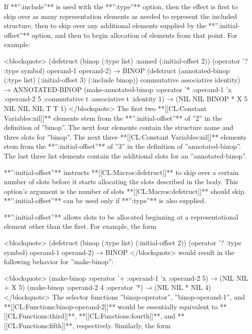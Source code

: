 If **'':include''** is used with the **'':type''** option, then the effect is first to skip over as many representation elements as needed to represent the included structure, then to skip over any additional elements supplied by the **'':initial-offset''** option, and then to begin allocation of elements from that point. For example:

<blockquote> (defstruct (binop (:type list) :named (:initial-offset 2)) (operator '? :type symbol) operand-1 operand-2) → BINOP (defstruct (annotated-binop (:type list) (:initial-offset 3) (:include binop)) commutative associative identity) → ANNOTATED-BINOP (make-annotated-binop :operator '* :operand-1 'x :operand-2 5 :commutative t :associative t :identity 1) → (NIL NIL BINOP * X 5 NIL NIL NIL T T 1) </blockquote> The first two **[[CL:Constant Variables:nil]]** elements stem from the **'':initial-offset''** of ''2'' in the definition of ''binop''. The next four elements contain the structure name and three slots for ''binop''. The next three **[[CL:Constant Variables:nil]]** elements stem from the **'':initial-offset''** of ''3'' in the definition of ''annotated-binop''. The last three list elements contain the additional slots for an ''annotated-binop''.


**'':initial-offset''** instructs **[[CL:Macros:defstruct]]** to skip over a certain number of slots before it starts allocating the slots described in the body. This option's argument is the number of slots **[[CL:Macros:defstruct]]** should skip. **'':initial-offset''** can be used only if **'':type''** is also supplied.


**'':initial-offset''** allows slots to be allocated beginning at a representational element other than the first. For example, the form

<blockquote> (defstruct (binop (:type list) (:initial-offset 2)) (operator '? :type symbol) operand-1 operand-2) → BINOP </blockquote> would result in the following behavior for ''make-binop'':

<blockquote> (make-binop :operator '+ :operand-1 'x :operand-2 5) → (NIL NIL + X 5) (make-binop :operand-2 4 :operator '*) → (NIL NIL * NIL 4) </blockquote> The selector functions ''binop-operator'', ''binop-operand-1'', and **[[CL:Functions:binop-operand-2]]** would be essentially equivalent to **[[CL:Functions:third]]**, **[[CL:Functions:fourth]]**, and **[[CL:Functions:fifth]]**, respectively. Similarly, the form

